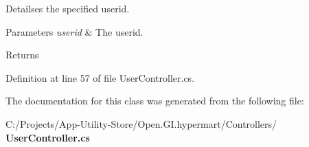 Detailses the specified userid. 


\begin{DoxyParams}{Parameters}
{\em userid} & The userid.\\
\hline
\end{DoxyParams}
\begin{DoxyReturn}{Returns}

\end{DoxyReturn}


Definition at line 57 of file User\+Controller.\+cs.



The documentation for this class was generated from the following file\+:\begin{DoxyCompactItemize}
\item 
C\+:/\+Projects/\+App-\/\+Utility-\/\+Store/\+Open.\+G\+I.\+hypermart/\+Controllers/\textbf{ User\+Controller.\+cs}\end{DoxyCompactItemize}
